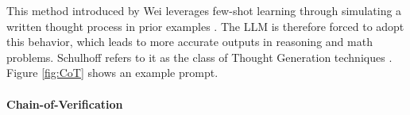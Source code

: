 This method introduced by Wei leverages few-shot learning through simulating a written thought process in prior examples \cite{Wei.28.01.2022}. The LLM is therefore forced to adopt this behavior, which leads to more accurate outputs in reasoning and math problems. Schulhoff refers to it as the class of Thought Generation techniques \cite{Schulhoff.06.06.2024}. Figure \ref{fig:CoT} shows an example prompt.

\paragraph{Chain-of-Verification}
